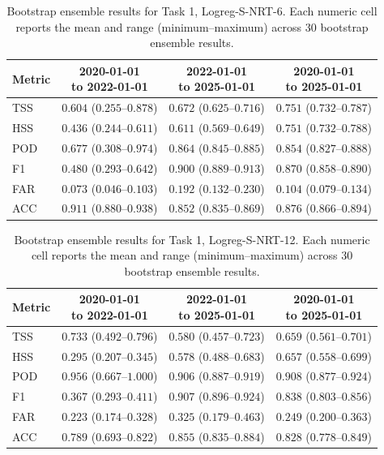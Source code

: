 \begin{table}[htbp]
\centering
\small
\caption{Bootstrap ensemble results for Task 1, Logreg-S-NRT-6. Each numeric cell reports the mean and range (minimum--maximum) across 30 bootstrap ensemble results.}
\label{tab:app-task1-logreg-s-nrt-6}
\begin{tabular}{lccc}
\toprule
Metric & \shortstack{2020-01-01\\to 2022-01-01} & \shortstack{2022-01-01\\to 2025-01-01} & \shortstack{2020-01-01\\to 2025-01-01} \\
\midrule
TSS & $0.604$ ($0.255$--$0.878$) & $0.672$ ($0.625$--$0.716$) & $0.751$ ($0.732$--$0.787$) \\
HSS & $0.436$ ($0.244$--$0.611$) & $0.611$ ($0.569$--$0.649$) & $0.751$ ($0.732$--$0.788$) \\
POD & $0.677$ ($0.308$--$0.974$) & $0.864$ ($0.845$--$0.885$) & $0.854$ ($0.827$--$0.888$) \\
F1 & $0.480$ ($0.293$--$0.642$) & $0.900$ ($0.889$--$0.913$) & $0.870$ ($0.858$--$0.890$) \\
FAR & $0.073$ ($0.046$--$0.103$) & $0.192$ ($0.132$--$0.230$) & $0.104$ ($0.079$--$0.134$) \\
ACC & $0.911$ ($0.880$--$0.938$) & $0.852$ ($0.835$--$0.869$) & $0.876$ ($0.866$--$0.894$) \\
\bottomrule
\end{tabular}
\end{table}
\clearpage

\begin{table}[htbp]
\centering
\small
\caption{Bootstrap ensemble results for Task 1, Logreg-S-NRT-12. Each numeric cell reports the mean and range (minimum--maximum) across 30 bootstrap ensemble results.}
\label{tab:app-task1-logreg-s-nrt-12}
\begin{tabular}{lccc}
\toprule
Metric & \shortstack{2020-01-01\\to 2022-01-01} & \shortstack{2022-01-01\\to 2025-01-01} & \shortstack{2020-01-01\\to 2025-01-01} \\
\midrule
TSS & $0.733$ ($0.492$--$0.796$) & $0.580$ ($0.457$--$0.723$) & $0.659$ ($0.561$--$0.701$) \\
HSS & $0.295$ ($0.207$--$0.345$) & $0.578$ ($0.488$--$0.683$) & $0.657$ ($0.558$--$0.699$) \\
POD & $0.956$ ($0.667$--$1.000$) & $0.906$ ($0.887$--$0.919$) & $0.908$ ($0.877$--$0.924$) \\
F1 & $0.367$ ($0.293$--$0.411$) & $0.907$ ($0.896$--$0.924$) & $0.838$ ($0.803$--$0.856$) \\
FAR & $0.223$ ($0.174$--$0.328$) & $0.325$ ($0.179$--$0.463$) & $0.249$ ($0.200$--$0.363$) \\
ACC & $0.789$ ($0.693$--$0.822$) & $0.855$ ($0.835$--$0.884$) & $0.828$ ($0.778$--$0.849$) \\
\bottomrule
\end{tabular}
\end{table}
\clearpage


